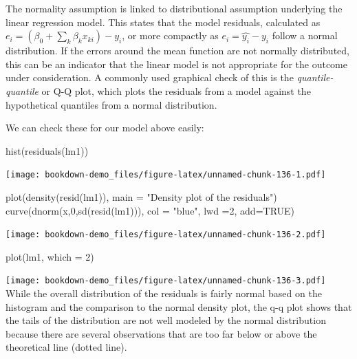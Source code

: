 \documentclass[
]{article}
\newenvironment{Shaded}{\begin{snugshade}}{\end{snugshade}}
\newcommand{\AttributeTok}[1]{\textcolor[rgb]{0.77,0.63,0.00}{#1}}
\newcommand{\ConstantTok}[1]{\textcolor[rgb]{0.00,0.00,0.00}{#1}}
\newcommand{\DecValTok}[1]{\textcolor[rgb]{0.00,0.00,0.81}{#1}}
\newcommand{\FunctionTok}[1]{\textcolor[rgb]{0.00,0.00,0.00}{#1}}
\newcommand{\NormalTok}[1]{#1}
\newcommand{\StringTok}[1]{\textcolor[rgb]{0.31,0.60,0.02}{#1}}
\begin{document}
The normality assumption is linked to distributional assumption underlying the linear regression model. This states that the model residuals, calculated as \(e_i = (\beta_0 +\sum_k \beta_k x_{ki}) - y_i\), or more compactly as \(e_i =\hat{y_i} - y_i\) follow a normal distribution. If the errors around the mean function are not normally distributed, this can be an indicator that the linear model is not appropriate for the outcome under consideration. A commonly used graphical check of this is the \emph{quantile-quantile} or Q-Q plot, which plots the residuals from a model against the hypothetical quantiles from a normal distribution.

We can check these for our model above easily:

\begin{Shaded}
\begin{Highlighting}[]
\FunctionTok{hist}\NormalTok{(}\FunctionTok{residuals}\NormalTok{(lm1))}
\end{Highlighting}
\end{Shaded}

\texttt{[image: bookdown-demo\_files/figure-latex/unnamed-chunk-136-1.pdf]}

\begin{Shaded}
\begin{Highlighting}[]
\FunctionTok{plot}\NormalTok{(}\FunctionTok{density}\NormalTok{(}\FunctionTok{resid}\NormalTok{(lm1)),}
     \AttributeTok{main =} \StringTok{"Density plot of the residuals"}\NormalTok{)}
\FunctionTok{curve}\NormalTok{(}\FunctionTok{dnorm}\NormalTok{(x,}\DecValTok{0}\NormalTok{,}\FunctionTok{sd}\NormalTok{(}\FunctionTok{resid}\NormalTok{(lm1))),}
       \AttributeTok{col =} \StringTok{"blue"}\NormalTok{, }\AttributeTok{lwd =}\DecValTok{2}\NormalTok{, }\AttributeTok{add=}\ConstantTok{TRUE}\NormalTok{)}
\end{Highlighting}
\end{Shaded}

\texttt{[image: bookdown-demo\_files/figure-latex/unnamed-chunk-136-2.pdf]}

\begin{Shaded}
\begin{Highlighting}[]
\FunctionTok{plot}\NormalTok{(lm1, }\AttributeTok{which =} \DecValTok{2}\NormalTok{)}
\end{Highlighting}
\end{Shaded}

\texttt{[image: bookdown-demo\_files/figure-latex/unnamed-chunk-136-3.pdf]}
While the overall distribution of the residuals is fairly normal based on the histogram and the comparison to the normal density plot, the q-q plot shows that the tails of the distribution are not well modeled by the normal distribution because there are several observations that are too far below or above the theoretical line (dotted line).
\end{document}
